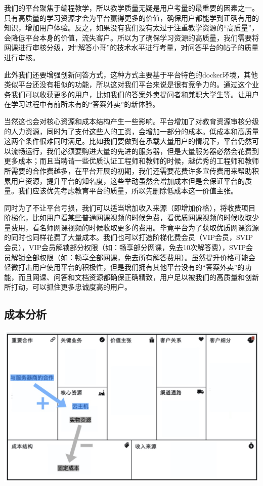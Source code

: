 \documentclass[a4paper]{ctexart}
\begin{document}
我们的平台聚焦于编程教学，所以教学质量无疑是用户考量的最重要的因素之一。只有高质量的学习资源才会为平台赢得更多的价值，确保用户都能学到正确有用的知识，增加用户体验。反之，如果没有我们没有太过于注重教学资源的“高质量”，会降低平台本身的价值，流失客户。所以为了确保学习资源的高质量，我们需要将网课进行审核分级，对“解答小哥”的技术水平进行考量，对问答平台的帖子的质量进行审核。

此外我们还要增强创新问答方式，这种方式主要基于平台特色的docker环境，其他类似平台还没有相似的功能，所以这对我们平台来说是很有竞争力的。通过这个业务我们可以收获更多的用户，比如我们的答案外卖提问者和兼职大学生等。让用户在学习过程中有前所未有的“答案外卖”的新体验。

当然这也会对核心资源和成本结构产生一些影响。平台增加了对教育资源审核分级的人力资源，同时为了支付这些人的工资，会增加一部分的成本。低成本和高质量这两个条件很难同时满足。比如我们要做到在承载大量用户的情况下，平台仍然可以流畅运行，我们必须要购进大量的先进的服务器，但是大量服务器必然会花费到更多成本；而且当聘请一些优质认证工程师和教师的时候，越优秀的工程师和教师所需要的合作费越多，在平台开展的初期，我们还需要花费许多宣传费用来帮助积累用户资源，提升平台的知名度，这些举动虽然会增加成本但是会保证平台的质量。我们应该优先考虑教育平台的质量，所以先删除低成本这一价值主张。

同时为了不让平台亏损，我们可以适当增加收入来源（即增加价格），将收费项目阶梯化，比如用户看某些普通网课视频的时候免费，看优质网课视频的时候收取少量费用，看名师网课视频的时候收取更多的费用。毕竟平台为了获取优质网课资源的同时也同样花费了大量成本。我们也可以打造阶梯化费会员（VIP会员，SVIP会员），VIP会员解锁部分权限（如：畅享部分网课，免去10次解答费），SVIP会员解锁全部权限（如：畅享全部网课，免去所有解答费用）。虽然提升价格可能会轻微打击用户使用平台的积极性，但是我们拥有其他平台没有的“答案外卖”的功能，而且网课、问答和文档资源都确保正确精致，用户足以被我们的高质量和创新所打动，可以抓住更多忠诚度高的用户。

\subsection{成本分析}
\begin{center}
  \includegraphics[scale=0.3]{成本分析.png}
\end{center}
\end{document}
